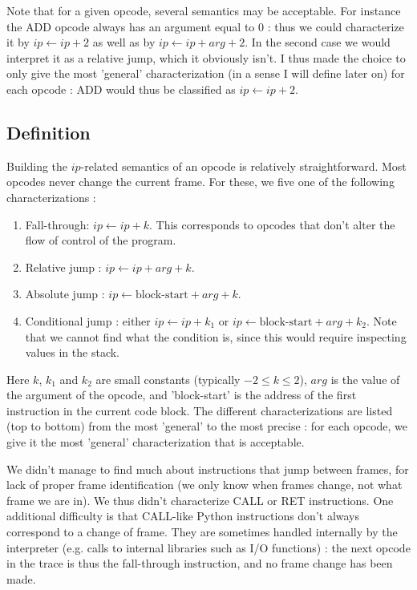 \documentclass[french]{article}
\begin{document}
Note that for a given opcode, several semantics may be acceptable. For instance the ADD opcode always has an argument equal to $0$ : thus we could characterize it by $ip \leftarrow ip + 2$ as well as by $ip \leftarrow ip + arg + 2$. In the second case we would interpret it as a relative jump, which it obviously isn't. I thus made the choice to only give the most 'general' characterization (in a sense I will define later on) for each opcode : ADD would thus be classified as $ip \leftarrow ip + 2$.

\subsection{Definition}

Building the $ip$-related semantics of an opcode is relatively straightforward. Most opcodes never change the current frame. For these, we five one of the following characterizations :
\begin{enumerate}
	\item Fall-through: $ip \leftarrow ip + k$. This corresponds to opcodes that don't alter the flow of control of the program.
	\item Relative jump : $ip \leftarrow ip + arg + k$.
	\item Absolute jump : $ip \leftarrow \textrm{block-start} + arg + k$.
	\item Conditional jump : $\textrm{either } ip \leftarrow ip + k_1 \textrm{ or } ip \leftarrow \textrm{block-start} + arg + k_2$. Note that we cannot find what the condition is, since this would require inspecting values in the stack.
\end{enumerate}
Here $k$, $k_1$ and $k_2$ are small constants (typically $-2 \leq k \leq 2$), $arg$ is the value of the argument of the opcode, and 'block-start' is the address of the first instruction in the current code block. 
The different characterizations are listed (top to bottom) from the most 'general' to the most precise : for each opcode, we give it the most 'general' characterization that is acceptable.

We didn't manage to find much about instructions that jump between frames, for lack of proper frame identification (we only know when frames change, not what frame we are in). We thus didn't characterize CALL or RET instructions. One additional difficulty is that CALL-like Python instructions don't always correspond to a change of frame. They are sometimes handled internally by the interpreter (e.g. calls to internal libraries such as I/O functions) : the next opcode in the trace is thus the fall-through instruction, and no frame change has been made.
\end{document}
